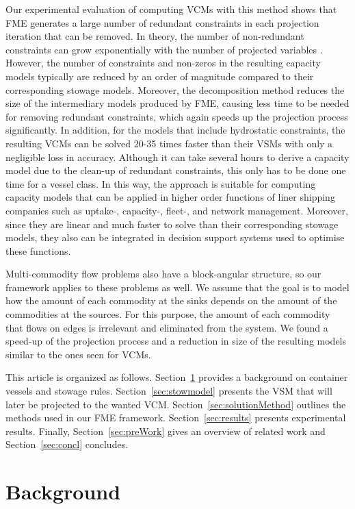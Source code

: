 Our experimental evaluation of computing VCMs with this method shows that FME generates a large number of redundant constraints in each projection iteration that can be removed. In theory, the number of non-redundant constraints can grow exponentially with the number of projected variables \cite{monniaux10}. However, the number of constraints and non-zeros in the resulting capacity models typically are reduced by an order of magnitude compared to their corresponding stowage models. Moreover, the decomposition method reduces the size of the intermediary models produced by FME, causing less time to be needed for removing redundant constraints, which again speeds up the projection process significantly. In addition, for the models that include hydrostatic constraints, the resulting VCMs can be solved 20-35 times faster than their VSMs with only a negligible loss in accuracy. Although it can take several hours to derive a capacity model due to the clean-up of redundant constraints, this only has to be done one time for a vessel class. In this way, the approach is suitable for computing capacity models that can be applied in higher order functions of liner shipping companies such as uptake-, capacity-, fleet-, and network management. Moreover, since they are linear and much faster to solve than their corresponding stowage models, they also can be integrated in decision support systems used to optimise these functions.

Multi-commodity flow problems also have a block-angular structure, so our framework applies to these problems as well. We assume that the goal is to model how the amount of each commodity at the sinks depends on the amount of the commodities at the sources. For this purpose, the amount of each commodity that flows on edges is irrelevant and eliminated from the system. We found a speed-up of the projection process and a reduction in size of the resulting models similar to the ones seen for VCMs.

This article is organized as follows. Section~\ref{sec:background} provides a background on container vessels and stowage rules. Section~\ref{sec:stowmodel} presents the VSM that will later be projected to the wanted VCM. Section~\ref{sec:solutionMethod} outlines the methods used in our FME framework. Section~\ref{sec:results} presents experimental results. Finally, Section~\ref{sec:preWork} gives an overview of related work and Section~\ref{sec:concl} concludes.



\section{Background} \label{sec:background}

